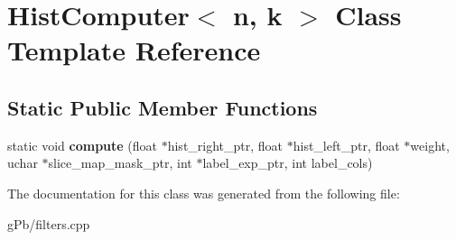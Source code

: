 \hypertarget{class_hist_computer}{\section{Hist\-Computer$<$ n, k $>$ Class Template Reference}
\label{class_hist_computer}
}
\subsection*{Static Public Member Functions}
\begin{DoxyCompactItemize}
\item 
\hypertarget{class_hist_computer_a66e8c4f1cab66728978dce7935cf82b9}{static void {\bfseries compute} (float $\ast$hist\-\_\-right\-\_\-ptr, float $\ast$hist\-\_\-left\-\_\-ptr, float $\ast$weight, uchar $\ast$slice\-\_\-map\-\_\-mask\-\_\-ptr, int $\ast$label\-\_\-exp\-\_\-ptr, int label\-\_\-cols)}\label{class_hist_computer_a66e8c4f1cab66728978dce7935cf82b9}

\end{DoxyCompactItemize}


The documentation for this class was generated from the following file\-:\begin{DoxyCompactItemize}
\item 
g\-Pb/filters.\-cpp\end{DoxyCompactItemize}
